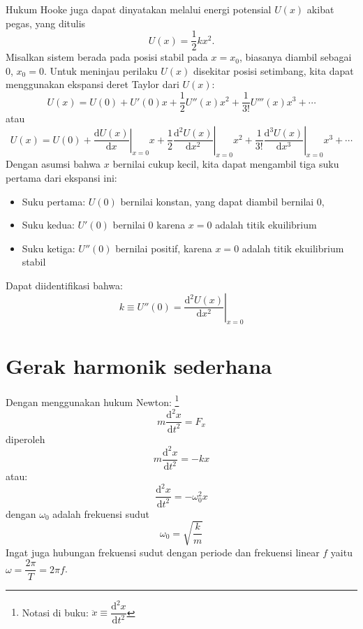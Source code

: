 Hukum Hooke juga dapat dinyatakan melalui energi potensial $U(x)$ akibat pegas, yang ditulis
\begin{equation}
U(x)=\frac{1}{2}kx^{2}.
\end{equation}
Misalkan sistem berada pada posisi stabil pada $x = x_{0}$, biasanya
diambil sebagai 0, $x_{0} = 0$.
Untuk meninjau perilaku $U(x)$ disekitar posisi setimbang, kita dapat menggunakan ekspansi deret
Taylor dari $U(x)$:
\begin{equation}
U(x) = U(0) + U'(0)x + \frac{1}{2}U''(x)x^{2} + \frac{1}{3!}U'''(x)x^{3} + \cdots
\end{equation}
atau
$$
U(x) = U(0) + \left. \frac{\mathrm{d}U(x)}{\mathrm{d}x}\right |_{x=0} x +
\frac{1}{2} \left. \frac{\mathrm{d}^{2}U(x)}{\mathrm{d}x^{2}}\right |_{x=0} x^{2} +
\frac{1}{3!} \left. \frac{\mathrm{d}^{3}U(x)}{\mathrm{d}x^{3}}\right |_{x=0} x^{3} + \cdots
$$
Dengan asumsi bahwa  $x$ bernilai cukup kecil, kita dapat mengambil tiga suku pertama
dari ekspansi ini:
\begin{itemize}
\item Suku pertama: $U(0)$ bernilai konstan, yang dapat diambil bernilai 0,
\item Suku kedua: $U'(0)$ bernilai 0 karena $x = 0$ adalah titik ekuilibrium
\item Suku ketiga: $U''(0)$ bernilai positif, karena $x = 0$ adalah titik ekuilibrium stabil
\end{itemize}
Dapat diidentifikasi bahwa:
\begin{equation}
k \equiv U''(0) = \left. \frac{\mathrm{d}^{2}U(x)}{\mathrm{d}x^{2}} \right|_{x=0}
\end{equation}


\section{Gerak harmonik sederhana}

Dengan menggunakan hukum Newton:
\footnote{
Notasi di buku: $\ddot{x}\equiv\dfrac{\mathrm{d}^{2}x}{\mathrm{d}t^{2}}$
}
\begin{equation*}
m \frac{\mathrm{d}^2x}{\mathrm{d}t^2} = F_x
\end{equation*}
%
diperoleh
%
\begin{equation*}
m \frac{\mathrm{d}^2x}{\mathrm{d}t^2}  = -kx
\end{equation*}
%
atau:
%
\begin{equation}
\frac{\mathrm{d}^2x}{\mathrm{d}t^2} = -\omega_0^2 x
\label{eq:Taylor_5_4}
\end{equation}
%
dengan $\omega_0$ adalah frekuensi sudut
%
\begin{equation}
\omega_{0} = \sqrt{\frac{k}{m}}
\end{equation}
%
Ingat juga hubungan frekuensi sudut dengan periode dan frekuensi linear $f$
yaitu $\omega = \dfrac{2 \pi}{T} = 2 \pi f$.

